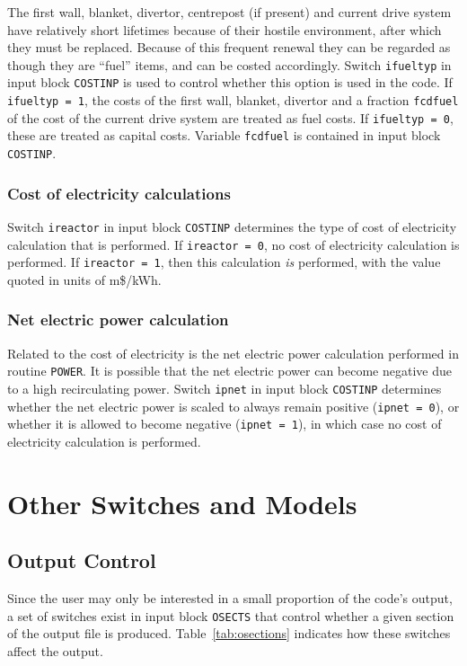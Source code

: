 The first wall, blanket, divertor, centrepost (if present) and current drive
system have relatively short lifetimes because of their hostile environment,
after which they must be replaced. Because of this frequent renewal they can
be regarded as though they are ``fuel'' items, and can be costed
accordingly. Switch {\tt ifueltyp} in input block {\tt COSTINP} is used to
control whether this option is used in the code. If {\tt ifueltyp = 1}, the
costs of the first wall, blanket, divertor and a fraction {\tt fcdfuel} of the
cost of the current drive system are treated as fuel costs. If {\tt ifueltyp =
0}, these are treated as capital costs. Variable {\tt fcdfuel} is contained in
input block {\tt COSTINP}.

\subsubsection{Cost of electricity calculations}

Switch {\tt ireactor} in input block {\tt COSTINP} determines the type of cost
of electricity calculation that is performed. If {\tt ireactor = 0}, no cost
of electricity calculation is performed. If {\tt ireactor = 1}, then this
calculation {\em is}\/ performed, with the value quoted in units of
m\$/kWh.

\subsubsection{Net electric power calculation}

Related to the cost of electricity is the net electric power calculation
performed in routine {\tt POWER}. It is possible that the net electric power
can become negative due to a high recirculating power. Switch {\tt ipnet} in
input block {\tt COSTINP} determines whether the net electric power is scaled
to always remain positive ({\tt ipnet = 0}), or whether it is allowed to
become negative ({\tt ipnet = 1}), in which case no cost of electricity
calculation is performed.

\section{Other Switches and Models}

\subsection{Output Control}

Since the user may only be interested in a small proportion of the code's
output, a set of switches exist in input block {\tt OSECTS} that control
whether a given section of the output file is produced.
Table~\ref{tab:osections} indicates how these switches affect the output.

